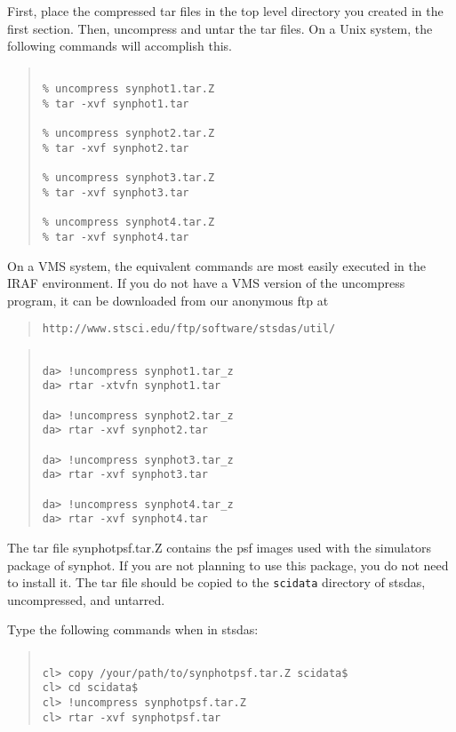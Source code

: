 \documentclass{article}
\begin{document}
First, place the compressed tar files in the top level directory you
created in the first section. Then, uncompress and untar the tar
files. On a Unix system, the following commands will accomplish this.

\begin{quote}\begin{verbatim}

% uncompress synphot1.tar.Z 
% tar -xvf synphot1.tar

% uncompress synphot2.tar.Z 
% tar -xvf synphot2.tar

% uncompress synphot3.tar.Z 
% tar -xvf synphot3.tar

% uncompress synphot4.tar.Z 
% tar -xvf synphot4.tar

\end{verbatim}\end{quote}

On a VMS system, the equivalent commands are most easily executed in
the IRAF environment. If you do not have a VMS version of the
uncompress program, it can be downloaded from our anonymous ftp at

\begin{quote}\begin{verbatim}
http://www.stsci.edu/ftp/software/stsdas/util/
\end{verbatim}\end{quote}

\begin{quote}\begin{verbatim}

da> !uncompress synphot1.tar_z
da> rtar -xtvfn synphot1.tar

da> !uncompress synphot2.tar_z
da> rtar -xvf synphot2.tar    

da> !uncompress synphot3.tar_z
da> rtar -xvf synphot3.tar    

da> !uncompress synphot4.tar_z
da> rtar -xvf synphot4.tar    

\end{verbatim}\end{quote}

The tar file synphotpsf.tar.Z contains the psf images used with the
simulators package of synphot. If you are not planning to use this
package, you do not need to install it. The tar file should be copied
to the {\tt scidata} directory of stsdas, uncompressed, and untarred.


Type the following commands when in stsdas:

\begin{quote}\begin{verbatim}

cl> copy /your/path/to/synphotpsf.tar.Z scidata$
cl> cd scidata$
cl> !uncompress synphotpsf.tar.Z
cl> rtar -xvf synphotpsf.tar

\end{verbatim}\end{quote}
\end{document}
